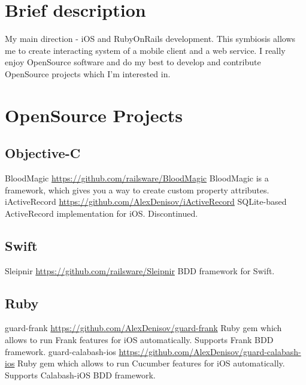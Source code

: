 \documentclass[11pt,a4paper]{moderncv}
\begin{document}
\maketitle

\section{Brief description}
\cvline
  {}
  {My main direction - iOS and RubyOnRails development.\newline{}
  This symbiosis allows me to create interacting system of a mobile client and a web service.\newline{}
  I really enjoy OpenSource software and do my best to develop and contribute OpenSource projects which I'm interested in.}

\section{OpenSource Projects}
\subsection{Objective-C}
\cvline
  {BloodMagic}
  {\url{https://github.com/railsware/BloodMagic}\newline{}
  BloodMagic is a framework, which gives you a way to create custom property attributes.}
\cvline
  {iActiveRecord}
  {\url{https://github.com/AlexDenisov/iActiveRecord}\newline{}
  SQLite-based ActiveRecord implementation for iOS.\newline{}
  Discontinued.}
\subsection{Swift}
\cvline
  {Sleipnir}
  {\url{https://github.com/railsware/Sleipnir}\newline{}
  BDD framework for Swift.}
\subsection{Ruby}
\cvline
  {guard-frank}
  {\url{https://github.com/AlexDenisov/guard-frank}\newline{}
  Ruby gem which allows to run Frank features for iOS automatically.
  \newline{}Supports Frank BDD framework.}
\cvline
  {guard-calabash-ios}
  {\url{https://github.com/AlexDenisov/guard-calabash-ios}\newline{}
  Ruby gem which allows to run Cucumber features for iOS automatically.
  \newline{}Supports Calabash-iOS BDD framework.}
\end{document}

